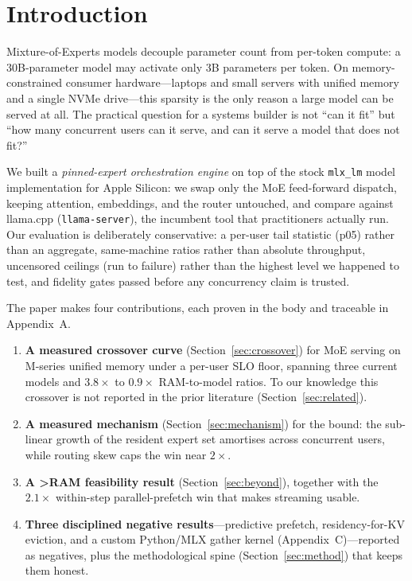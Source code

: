 \documentclass[11pt]{article}
\newcommand{\ppl}{\ensuremath{\times}}
\begin{document}
\section{Introduction}

Mixture-of-Experts models decouple parameter count from per-token compute: a
$30$B-parameter model may activate only $3$B parameters per token. On memory-constrained
consumer hardware---laptops and small servers with unified memory and a single NVMe
drive---this sparsity is the only reason a large model can be served at all. The
practical question for a systems builder is not ``can it fit'' but ``how many
concurrent users can it serve, and can it serve a model that does not fit?''

We built a \emph{pinned-expert orchestration engine} on top of the stock
\texttt{mlx\_lm} model implementation for Apple Silicon: we swap only the
MoE feed-forward dispatch, keeping attention, embeddings, and the router untouched, and
compare against llama.cpp (\texttt{llama-server}), the incumbent tool that practitioners
actually run. Our evaluation is deliberately conservative: a per-user tail statistic
(p05) rather than an aggregate, same-machine ratios rather than absolute throughput,
uncensored ceilings (run to failure) rather than the highest level we happened to test,
and fidelity gates passed before any concurrency claim is trusted.

The paper makes four contributions, each proven in the body and traceable in
Appendix~A.
\begin{enumerate}[leftmargin=1.7em,itemsep=1pt,topsep=3pt]
  \item \textbf{A measured crossover curve} (Section~\ref{sec:crossover}) for MoE serving
        on M-series unified memory under a per-user SLO floor, spanning three current
        models and $3.8\ppl$ to $0.9\ppl$ RAM-to-model ratios. To our knowledge this
        crossover is not reported in the prior literature (Section~\ref{sec:related}).
  \item \textbf{A measured mechanism} (Section~\ref{sec:mechanism}) for the bound: the
        sub-linear growth of the resident expert set amortises across concurrent users,
        while routing skew caps the win near $2\ppl$.
  \item \textbf{A >RAM feasibility result} (Section~\ref{sec:beyond}), together with the
        $2.1\ppl$ within-step parallel-prefetch win that makes streaming usable.
  \item \textbf{Three disciplined negative results}---predictive prefetch,
        residency-for-KV eviction, and a custom Python/MLX gather kernel
        (Appendix~C)---reported as negatives, plus the methodological spine
        (Section~\ref{sec:method}) that keeps them honest.
\end{enumerate}
\end{document}
